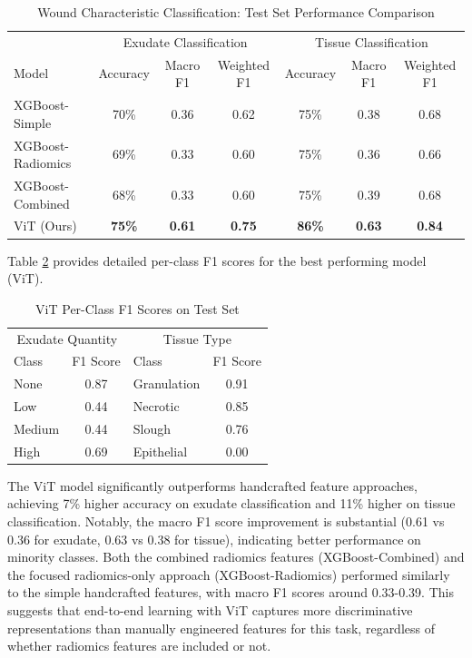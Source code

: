 \documentclass{article}
\begin{document}
\begin{table}[h]
  \caption{Wound Characteristic Classification: Test Set Performance Comparison}
  \centering
  \begin{tabular}{l|ccc|ccc}
    \toprule
    & \multicolumn{3}{c|}{Exudate Classification} & \multicolumn{3}{c}{Tissue Classification} \\
    Model & Accuracy & Macro F1 & Weighted F1 & Accuracy & Macro F1 & Weighted F1 \\
    \midrule
    XGBoost-Simple & 70\% & 0.36 & 0.62 & 75\% & 0.38 & 0.68 \\
    XGBoost-Radiomics & 69\% & 0.33 & 0.60 & 75\% & 0.36 & 0.66 \\
    XGBoost-Combined & 68\% & 0.33 & 0.60 & 75\% & 0.39 & 0.68 \\
    ViT (Ours) & \textbf{75\%} & \textbf{0.61} & \textbf{0.75} & \textbf{86\%} & \textbf{0.63} & \textbf{0.84} \\
    \bottomrule
  \end{tabular}
  \label{tab:wound_classification}
\end{table}

Table \ref{tab:wound_classification_detail} provides detailed per-class F1 scores for the best performing model (ViT).

\begin{table}[h]
  \caption{ViT Per-Class F1 Scores on Test Set}
  \centering
  \begin{tabular}{lc|lc}
    \toprule
    \multicolumn{2}{c|}{Exudate Quantity} & \multicolumn{2}{c}{Tissue Type} \\
    Class & F1 Score & Class & F1 Score \\
    \midrule
    None & 0.87 & Granulation & 0.91 \\
    Low & 0.44 & Necrotic & 0.85 \\
    Medium & 0.44 & Slough & 0.76 \\
    High & 0.69 & Epithelial & 0.00 \\
    \bottomrule
  \end{tabular}
  \label{tab:wound_classification_detail}
\end{table}

The ViT model significantly outperforms handcrafted feature approaches, achieving 7\% higher accuracy on exudate classification and 11\% higher on tissue classification. Notably, the macro F1 score improvement is substantial (0.61 vs 0.36 for exudate, 0.63 vs 0.38 for tissue), indicating better performance on minority classes. Both the combined radiomics features (XGBoost-Combined) and the focused radiomics-only approach (XGBoost-Radiomics) performed similarly to the simple handcrafted features, with macro F1 scores around 0.33-0.39. This suggests that end-to-end learning with ViT captures more discriminative representations than manually engineered features for this task, regardless of whether radiomics features are included or not.
\end{document}
